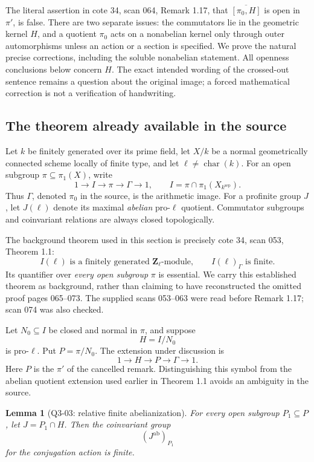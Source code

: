 \documentclass[11pt,a4paper]{article}
\newtheorem{lemma}[theorem]{Lemma}
\theoremstyle{remark}
\begin{document}
The literal assertion in cote 34, scan 064, Remark 1.17, that
\(\overline{[\pi_0,H]}\) is open in \(\pi'\), is false.
There are two separate issues: the commutators lie in the geometric
kernel \(H\), and a quotient \(\pi_0\) acts on a nonabelian kernel only
through outer automorphisms unless an action or a section is specified.
We prove the natural precise corrections, including the soluble
nonabelian statement.  All openness conclusions below concern \(H\).
The exact intended wording of the crossed-out sentence remains a
question about the original image; a forced mathematical correction is
not a verification of handwriting.

\subsection{The theorem already available in the source}

Let \(k\) be finitely generated over its prime field, let \(X/k\) be a
normal geometrically connected scheme locally of finite type, and let
\(\ell\ne\operatorname{char}(k)\).  For an open subgroup
\(\pi\subseteq\pi_1(X)\), write
\[
1\longrightarrow I\longrightarrow\pi\longrightarrow\Gamma
\longrightarrow1,
\qquad
I=\pi\cap\pi_1(X_{k^{\mathrm{sep}}}).
\]
Thus \(\Gamma\), denoted \(\pi_0\) in the source, is the arithmetic
image.  For a profinite group \(J\), let \(J(\ell)\) denote its maximal
\emph{abelian} pro-\(\ell\) quotient.  Commutator subgroups and
coinvariant relations are always closed topologically.

The background theorem used in this section is precisely cote 34,
scan 053, Theorem 1.1:
\[
 I(\ell)\text{ is a finitely generated }\mathbf Z_\ell\text{-module},
 \qquad I(\ell)_\Gamma\text{ is finite}.
 \tag{Q3-B01}
\]
Its quantifier over \emph{every open subgroup} \(\pi\) is essential.
We carry this established theorem as background, rather than claiming
to have reconstructed the omitted proof pages 065--073.  The supplied
scans 053--063 were read before Remark 1.17; scan 074 was also checked.

Let \(N_0\subseteq I\) be closed and normal in \(\pi\), and suppose
\[
H=I/N_0
\]
is pro-\(\ell\).  Put \(P=\pi/N_0\).  The extension under discussion is
\[
1\longrightarrow H\longrightarrow P\longrightarrow\Gamma
\longrightarrow1. \tag{Q3-E}
\]
Here \(P\) is the \(\pi'\) of the cancelled remark.  Distinguishing this
symbol from the abelian quotient extension used earlier in Theorem 1.1
avoids an ambiguity in the source.

\begin{lemma}[Q3-03: relative finite abelianization]
\label{q3:relative}
For every open subgroup \(P_1\subseteq P\), let \(J=P_1\cap H\).
Then the coinvariant group
\[
(J^{\mathrm{ab}})_{P_1}
\]
for the conjugation action is finite.
\end{lemma}
\end{document}
